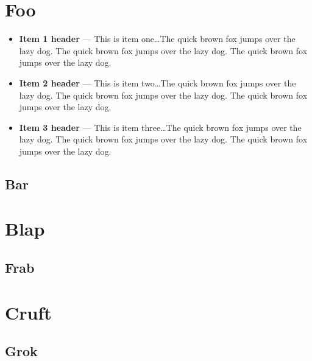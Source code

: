 \documentclass[11pt]{article}%
\begin{document}
\begin{multicols}{2}
\section{Foo}
\lipsum[1-4]
\begin{itemize}
\item {\bf Item 1 header} --- This is item one\dots The quick brown fox jumps over the lazy dog. The quick brown fox jumps over the lazy dog. The quick brown fox jumps over the lazy dog.
\item {\bf Item 2 header} --- This is item two\dots The quick brown fox jumps over the lazy dog. The quick brown fox jumps over the lazy dog. The quick brown fox jumps over the lazy dog.
\item {\bf Item 3 header} --- This is item three\dots The quick brown fox jumps over the lazy dog. The quick brown fox jumps over the lazy dog. The quick brown fox jumps over the lazy dog.
\end{itemize}
\subsection{Bar}
\lipsum[5-8]
\section{Blap}
\lipsum[1-4]
\subsection{Frab}
\lipsum[5-8]
\section{Cruft}
\lipsum[1-4]
\subsection{Grok}
\lipsum[5-8]
\end{multicols}
\end{document}
